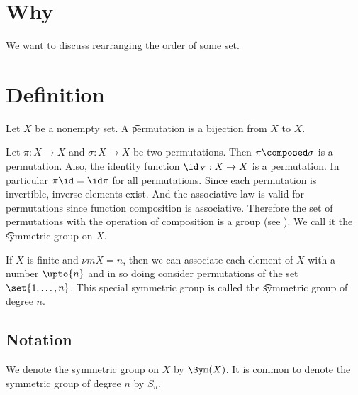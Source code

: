 
\section*{Why}

We want to discuss rearranging the order of some set.

\section*{Definition}

Let $X$ be a nonempty set.
A \t{permutation} is a bijection from $X$ to $X$.

Let $\pi : X \to X$ and $\sigma : X \to X$ be two permutations.
Then $\pi  \composed \sigma $ is a permutation.
Also, the identity function $\id_{X}: X \to X$ is a permutation.
In particular $\pi \id = \id\pi $ for all permutations.
Since each permutation is invertible, inverse elements exist.
And the associative law is valid for permutations since function composition is associative.
Therefore the set of permutations with the operation of composition is a group (see ).
We call it the \t{symmetric group on $X$}.

If $X$ is finite and $\nu m{X} = n$, then we can associate each element of $X$ with a number $\upto{n}$ and in so doing consider permutations of the set $\set{1, \dots , n}$.
This special symmetric group is called the \t{symmetric group of degree $n$}.

\subsection*{Notation}

We denote the symmetric group on $X$ by $\Sym(X)$.
It is common to denote the symmetric group of degree $n$ by $S_n$.

\blankpage